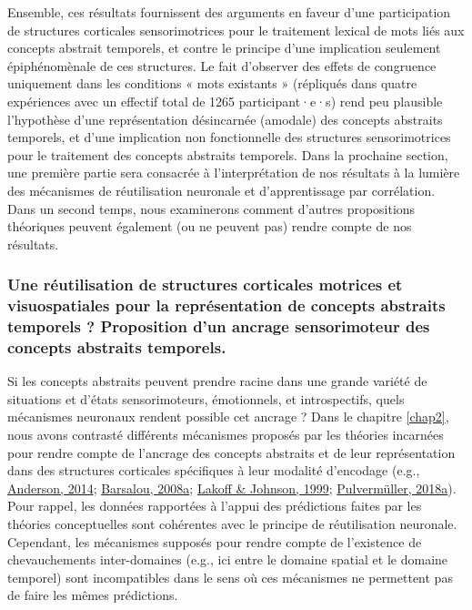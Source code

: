 \documentclass[
  a4paper,12pt,twoside,onecolumn,openright,final,oldfontcommands]{memoir}
\begin{document}
Ensemble, ces résultats fournissent des arguments en faveur d'une participation de structures corticales sensorimotrices pour le traitement lexical de mots liés aux concepts abstrait temporels, et contre le principe d'une implication seulement épiphénomènale de ces structures. Le fait d'observer des effets de congruence uniquement dans les conditions « mots existants » (répliqués dans quatre expériences avec un effectif total de 1265 participant·e·s) rend peu plausible l'hypothèse d'une représentation désincarnée (amodale) des concepts abstraits temporels, et d'une implication non fonctionnelle des structures sensorimotrices pour le traitement des concepts abstraits temporels. Dans la prochaine section, une première partie sera consacrée à l'interprétation de nos résultats à la lumière des mécanismes de réutilisation neuronale et d'apprentissage par corrélation. Dans un second temps, nous examinerons comment d'autres propositions théoriques peuvent également (ou ne peuvent pas) rendre compte de nos résultats.

\hypertarget{une-ruxe9utilisation-de-structures-corticales-motrices-et-visuospatiales-pour-la-repruxe9sentation-de-concepts-abstraits-temporels-proposition-dun-ancrage-sensorimoteur-des-concepts-abstraits-temporels.}{%
\subsubsection{Une réutilisation de structures corticales motrices et visuospatiales pour la représentation de concepts abstraits temporels ? Proposition d'un ancrage sensorimoteur des concepts abstraits temporels.}\label{une-ruxe9utilisation-de-structures-corticales-motrices-et-visuospatiales-pour-la-repruxe9sentation-de-concepts-abstraits-temporels-proposition-dun-ancrage-sensorimoteur-des-concepts-abstraits-temporels.}}

Si les concepts abstraits peuvent prendre racine dans une grande variété de situations et d'états sensorimoteurs, émotionnels, et introspectifs, quels mécanismes neuronaux rendent possible cet ancrage ? Dans le chapitre \ref{chap2}, nous avons contrasté différents mécanismes proposés par les théories incarnées pour rendre compte de l'ancrage des concepts abstraits et de leur représentation dans des structures corticales spécifiques à leur modalité d'encodage (e.g., \protect\hyperlink{ref-anderson_after_2014}{Anderson, 2014}; \protect\hyperlink{ref-barsalou_grounded_2008}{Barsalou, 2008a}; \protect\hyperlink{ref-lakoff_philosophy_1999}{Lakoff \& Johnson, 1999}; \protect\hyperlink{ref-pulvermuller_neural_2018}{Pulvermüller, 2018a}). Pour rappel, les données rapportées à l'appui des prédictions faites par les théories conceptuelles sont cohérentes avec le principe de réutilisation neuronale. Cependant, les mécanismes supposés pour rendre compte de l'existence de chevauchements inter-domaines (e.g., ici entre le domaine spatial et le domaine temporel) sont incompatibles dans le sens où ces mécanismes ne permettent pas de faire les mêmes prédictions.
\end{document}
